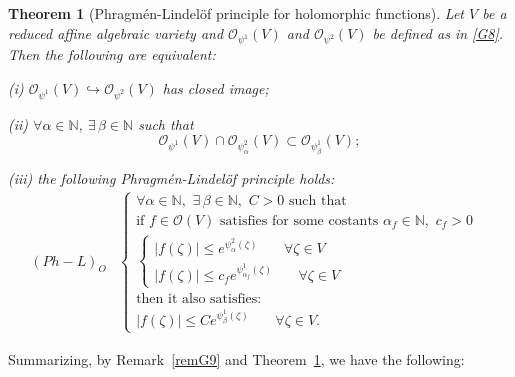 \documentclass[twoside]{amsart}
\newtheorem{Th}{Theorem}[section]
\begin{document}
\begin{Th}[Phragm\'en-Lindel\"of principle for holomorphic functions]
\label{thm:345} 
Let $V$ be a reduced affine
algebraic variety and ${\mathcal O}_{\psi^{1}}(V)$ and ${\mathcal O}_{\psi^{2}}(V)$
be defined as in \eqref{G8}. Then the following are equivalent:

(i) ${\mathcal O}_{\psi^{1}}(V)\hookrightarrow{\mathcal O}_{\psi^{2}}(V)$
has closed image;

(ii) $\forall\alpha\in{\mathbb N}$, $\exists\,\beta\in{\mathbb N}$ such that 
\[
{\mathcal O}_{\psi^{1}}(V)\cap{\mathcal O}_{\psi_{\alpha}^{2}}(V)
\subset{\mathcal O}_{\psi_{\beta}^{1}}(V);
\]

(iii) the following Phragm\'en-Lindel\"{o}f principle holds:
\begin{align*}
(Ph-L)_{O} & 
\begin{cases}
\forall\alpha\in{\mathbb N},\,\,\exists\,\beta\in{\mathbb N},\,\,C>0\,\,
\mbox{such that} & \mbox{}\\
\mbox{if }f\in{\mathcal O}(V)\,\,\mbox{satisfies for some costants }
\alpha_{f}\in{\mathbb N},\,\,c_{f}>0\\
\begin{cases}
|f(\zeta)|\leq e^{\psi_{\alpha}^{2}(\zeta)}
\,\,\,\,\,\,\,\,\,\,\,\forall\zeta\in V\\
|f(\zeta)|\leq c_{f}e^{\psi_{\alpha_{f}}^{1}(\zeta)}
\,\,\,\,\,\,\,\,\,\,\,\forall\zeta\in V
\end{cases}\\
\mbox{then it also satisfies:}\\
|f(\zeta)|\leq Ce^{\psi_{\beta}^{1}(\zeta)}
\,\,\,\,\,\,\,\,\,\,\,\forall\zeta\in V.
\end{cases}
\end{align*}
\end{Th}

Summarizing, by Remark~\ref{remG9} and Theorem~\ref{thm:345},
we have the following:
\end{document}
